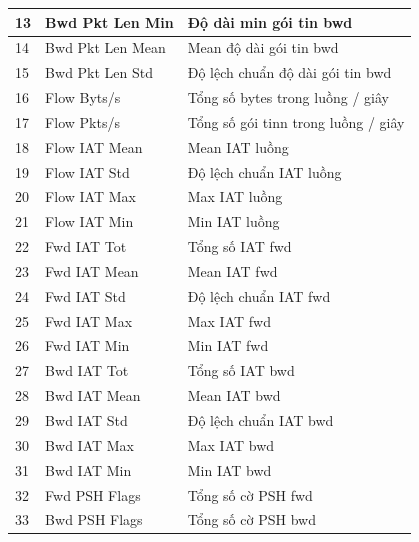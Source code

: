 \begin{center}
\begin{longtable}{|l|l|l|}
		13 & Bwd Pkt Len Min   & Độ   dài min gói tin bwd                           \\ \hline
		14 & Bwd Pkt Len Mean  & Mean   độ dài gói tin bwd                          \\ \hline
		15 & Bwd Pkt Len Std   & Độ   lệch chuẩn độ dài gói tin bwd                 \\ \hline
		16 & Flow Byts/s       & Tổng   số bytes trong luồng / giây                 \\ \hline
		17 & Flow Pkts/s       & Tổng   số gói tinn trong luồng / giây              \\ \hline
		18 & Flow IAT Mean     & Mean   IAT luồng                                   \\ \hline
		19 & Flow IAT Std      & Độ   lệch chuẩn IAT luồng                          \\ \hline
		20 & Flow IAT Max      & Max   IAT luồng                                    \\ \hline
		21 & Flow IAT Min      & Min   IAT luồng                                    \\ \hline
		22 & Fwd IAT Tot       & Tổng   số IAT fwd                                  \\ \hline
		23 & Fwd IAT Mean      & Mean   IAT fwd                                     \\ \hline
		24 & Fwd IAT Std       & Độ   lệch chuẩn IAT fwd                            \\ \hline
		25 & Fwd IAT Max       & Max   IAT fwd                                      \\ \hline
		26 & Fwd IAT Min       & Min   IAT fwd                                      \\ \hline
		27 & Bwd IAT Tot       & Tổng   số IAT bwd                                  \\ \hline
		28 & Bwd IAT Mean      & Mean   IAT bwd                                     \\ \hline
		29 & Bwd IAT Std       & Độ   lệch chuẩn IAT bwd                            \\ \hline
		30 & Bwd IAT Max       & Max   IAT bwd                                      \\ \hline
		31 & Bwd IAT Min       & Min   IAT bwd                                      \\ \hline
		32 & Fwd PSH Flags     & Tổng   số cờ PSH fwd                               \\ \hline
		33 & Bwd PSH Flags     & Tổng   số cờ PSH bwd                               \\ \hline

\end{longtable}
\end{center}
